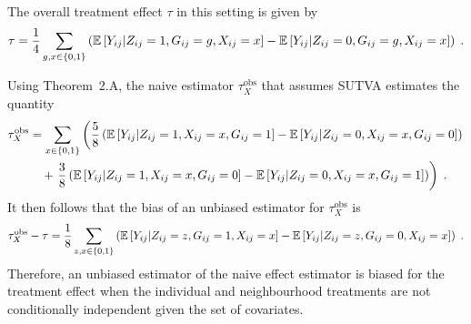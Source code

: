 \documentclass[10pt]{article}
\begin{document}

The overall treatment effect $\tau$ in this setting is given by
\[
\tau = \frac{1}{4}\sum_{g,x\in\{0,1\}} \left(\mathbb{E}\left[Y_{ij}|Z_{ij}=1,G_{ij}=g,X_{ij}=x\right] - \mathbb{E}\left[Y_{ij}|Z_{ij}=0,G_{ij}=g,X_{ij}=x\right]\right) \;.
\]
\iffalse
\begin{align*}
\tau &= \tau(0)\P(G_{ij}=0) + \tau(1)\P(G_{ij}=1) \\
&= \sum_{x_1,x_2\in\{0,1\}}\left(\tau(0)\P(G_{ij}=0|X_{i1}=x_1,X_{i2}=x_2) + \tau(1)\P(G_{ij}=1|X_{i1}=x_1,X_{i2}=x_2)\right)\P(X_{i1}=x_1,X_{i2}=x_2) \\
&= \frac{1}{4}\left(\tau(0)\left(\frac{1}{2}+\frac{3}{2}\right) + \tau(1)\left(\frac{3}{2}+\frac{1}{2}\right)\right) \\
&= \frac{1}{2}\left(\mu(1,0) + \mu(1,1) - \mu(0,0) - \mu(0,1)\right) \;.
\end{align*}
\fi
Using Theorem~2.A, the naive estimator $\tau_{X}^\text{obs}$ that assumes SUTVA estimates the quantity
\begin{align*}
\tau_{X}^\text{obs} &= \sum_{x\in\{0,1\}}\left(\frac{5}{8}\left(\mathbb{E}\left[Y_{ij}|Z_{ij}=1,X_{ij}=x,G_{ij}=1\right]-\mathbb{E}\left[Y_{ij}|Z_{ij}=0,X_{ij}=x,G_{ij}=0\right]\right) \right. \\
&\quad +\left. \frac{3}{8}\left(\mathbb{E}\left[Y_{ij}|Z_{ij}=1,X_{ij}=x,G_{ij}=0\right]-\mathbb{E}\left[Y_{ij}|Z_{ij}=0,X_{ij}=x,G_{ij}=1\right]\right) \right) \;.
\end{align*}
It then follows that the bias of an unbiased estimator for $\tau_{X}^\text{obs}$ is
\[
\tau_{X}^\text{obs} - \tau = \frac{1}{8}\sum_{z,x\in\{0,1\}}\left(\mathbb{E}\left[Y_{ij}|Z_{ij}=z,G_{ij}=1,X_{ij}=x\right] - \mathbb{E}\left[Y_{ij}|Z_{ij}=z,G_{ij}=0,X_{ij}=x\right]\right) \;.
\]
Therefore, an unbiased estimator of the naive effect estimator is biased for the treatment effect when the individual and neighbourhood treatments are not conditionally independent given the set of covariates.
\\
\end{document}
